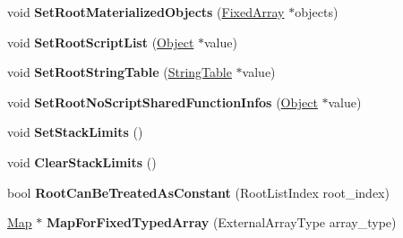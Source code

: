 \begin{DoxyCompactItemize}
\item 
void {\bfseries Set\+Root\+Materialized\+Objects} (\hyperlink{classv8_1_1internal_1_1_fixed_array}{Fixed\+Array} $\ast$objects)\hypertarget{classv8_1_1internal_1_1_heap_a0c0f0538cf0a68bcf995e65fa3851ba6}{}\label{classv8_1_1internal_1_1_heap_a0c0f0538cf0a68bcf995e65fa3851ba6}

\item 
void {\bfseries Set\+Root\+Script\+List} (\hyperlink{classv8_1_1internal_1_1_object}{Object} $\ast$value)\hypertarget{classv8_1_1internal_1_1_heap_abf65fbe4afdf1d33782877485794a2c3}{}\label{classv8_1_1internal_1_1_heap_abf65fbe4afdf1d33782877485794a2c3}

\item 
void {\bfseries Set\+Root\+String\+Table} (\hyperlink{classv8_1_1internal_1_1_string_table}{String\+Table} $\ast$value)\hypertarget{classv8_1_1internal_1_1_heap_a7e80af73d05b6f6808bed63ce53ba70c}{}\label{classv8_1_1internal_1_1_heap_a7e80af73d05b6f6808bed63ce53ba70c}

\item 
void {\bfseries Set\+Root\+No\+Script\+Shared\+Function\+Infos} (\hyperlink{classv8_1_1internal_1_1_object}{Object} $\ast$value)\hypertarget{classv8_1_1internal_1_1_heap_a9a4b125e8b2618a2c705f1e1de66f241}{}\label{classv8_1_1internal_1_1_heap_a9a4b125e8b2618a2c705f1e1de66f241}

\item 
void {\bfseries Set\+Stack\+Limits} ()\hypertarget{classv8_1_1internal_1_1_heap_a15c1be5638d9e7858555810ee6745a57}{}\label{classv8_1_1internal_1_1_heap_a15c1be5638d9e7858555810ee6745a57}

\item 
void {\bfseries Clear\+Stack\+Limits} ()\hypertarget{classv8_1_1internal_1_1_heap_a50d5de40f97bbb64cce340e67ed85e14}{}\label{classv8_1_1internal_1_1_heap_a50d5de40f97bbb64cce340e67ed85e14}

\item 
bool {\bfseries Root\+Can\+Be\+Treated\+As\+Constant} (Root\+List\+Index root\+\_\+index)\hypertarget{classv8_1_1internal_1_1_heap_a8210d4eb38ae08cd6a6f84977322b3f7}{}\label{classv8_1_1internal_1_1_heap_a8210d4eb38ae08cd6a6f84977322b3f7}

\item 
\hyperlink{classv8_1_1internal_1_1_map}{Map} $\ast$ {\bfseries Map\+For\+Fixed\+Typed\+Array} (External\+Array\+Type array\+\_\+type)\hypertarget{classv8_1_1internal_1_1_heap_aef6c1226be61703b2a418af51ed909b1}{}\label{classv8_1_1internal_1_1_heap_aef6c1226be61703b2a418af51ed909b1}


\end{DoxyCompactItemize}
